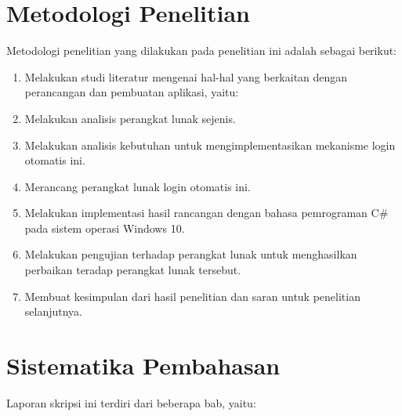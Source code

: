 \section{Metodologi Penelitian}
\label{sec:metodologi_penelitian}

Metodologi penelitian yang dilakukan pada penelitian ini adalah sebagai berikut:

\begin{enumerate}
    \item{Melakukan studi literatur mengenai hal-hal yang berkaitan dengan perancangan dan pembuatan aplikasi, yaitu:}
    \item{Melakukan analisis perangkat lunak sejenis.}
    \item{Melakukan analisis kebutuhan untuk mengimplementasikan mekanisme login otomatis ini.}
    \item{Merancang perangkat lunak login otomatis ini.}
    \item{Melakukan implementasi hasil rancangan dengan bahasa pemrograman C\# pada sistem operasi Windows 10.}
    \item{Melakukan pengujian terhadap perangkat lunak untuk menghasilkan perbaikan teradap perangkat lunak tersebut.}
    \item{Membuat kesimpulan dari hasil penelitian dan saran untuk penelitian selanjutnya.}
\end{enumerate}


\section{Sistematika Pembahasan}
\label{sec:sistematika_pembahasan}

Laporan skripsi ini terdiri dari beberapa bab, yaitu:

